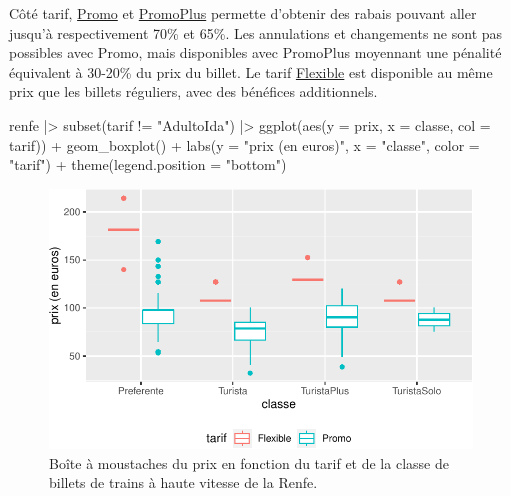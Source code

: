 \documentclass[
  11pt,
  letterpaper,
]{scrbook}
\newenvironment{Shaded}{\begin{snugshade}}{\end{snugshade}}
\newcommand{\AttributeTok}[1]{\textcolor[rgb]{0.40,0.45,0.13}{#1}}
\newcommand{\FunctionTok}[1]{\textcolor[rgb]{0.28,0.35,0.67}{#1}}
\newcommand{\NormalTok}[1]{\textcolor[rgb]{0.00,0.23,0.31}{#1}}
\newcommand{\SpecialCharTok}[1]{\textcolor[rgb]{0.37,0.37,0.37}{#1}}
\newcommand{\StringTok}[1]{\textcolor[rgb]{0.13,0.47,0.30}{#1}}
\theoremstyle{definition}
\theoremstyle{remark}
\begin{document}
Côté tarif,
\href{http://web.archive.org/web/20161111134241/http://www.renfe.com/viajeros/tarifas/billete_promo.html}{Promo}
et
\href{http://web.archive.org/web/20161110220249/http://www.renfe.com/viajeros/tarifas/billete_promoplus.html}{PromoPlus}
permette d'obtenir des rabais pouvant aller jusqu'à respectivement 70\%
et 65\%. Les annulations et changements ne sont pas possibles avec
Promo, mais disponibles avec PromoPlus moyennant une pénalité équivalent
à 30-20\% du prix du billet. Le tarif
\href{http://web.archive.org/web/20161108192609/http://www.renfe.com/viajeros/tarifas/billete_flexible.html}{Flexible}
est disponible au même prix que les billets réguliers, avec des
bénéfices additionnels.

\begin{Shaded}
\begin{Highlighting}[]
\NormalTok{renfe }\SpecialCharTok{|\textgreater{}} 
  \FunctionTok{subset}\NormalTok{(tarif  }\SpecialCharTok{!=} \StringTok{"AdultoIda"}\NormalTok{) }\SpecialCharTok{|\textgreater{}}
  \FunctionTok{ggplot}\NormalTok{(}\FunctionTok{aes}\NormalTok{(}\AttributeTok{y =}\NormalTok{ prix, }
             \AttributeTok{x =}\NormalTok{ classe, }
             \AttributeTok{col =}\NormalTok{ tarif)) }\SpecialCharTok{+} 
    \FunctionTok{geom\_boxplot}\NormalTok{() }\SpecialCharTok{+} 
    \FunctionTok{labs}\NormalTok{(}\AttributeTok{y =} \StringTok{"prix (en euros)"}\NormalTok{,}
         \AttributeTok{x =} \StringTok{"classe"}\NormalTok{,}
         \AttributeTok{color =} \StringTok{"tarif"}\NormalTok{) }\SpecialCharTok{+}
    \FunctionTok{theme}\NormalTok{(}\AttributeTok{legend.position =} \StringTok{"bottom"}\NormalTok{)}
\end{Highlighting}
\end{Shaded}

\begin{figure}[ht!]

{\centering \includegraphics[width=1\textwidth,height=\textheight]{./01-analyseexploratoire_files/figure-pdf/fig-renfe-aed6-1.pdf}

}

\caption{\label{fig-renfe-aed6}Boîte à moustaches du prix en fonction du
tarif et de la classe de billets de trains à haute vitesse de la Renfe.}

\end{figure}
\end{document}
